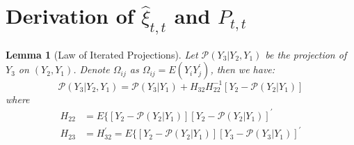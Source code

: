 \documentclass[12pt]{article}
\newtheorem{lemma}{Lemma}
\numberwithin{equation}{section}
\begin{document}

\printbibliography

\pagebreak
\appendix
\section{Derivation of $\hat{\xi}_{t,t}$ and $P_{t,t}$}

\begin{lemma}[Law of Iterated Projections] \label{lem:1}
    Let $\mathcal{P}(Y_3|Y_2,Y_1)$ be the projection of $Y_3$ on $(Y_2, Y_1)$. Denote $\Omega_{ij}$ as $\Omega_{ij} = E(Y_iY_j^{'})$, then we have:
    \[
        \mathcal{P}(Y_3|Y_2,Y_1) = \mathcal{P}(Y_3|Y_1)+H_{32}H_{22}^{-1}[Y_2 - \mathcal{P}(Y_2|Y_1)]
    \]
    where 
    \begin{align*}
        H_{22} &= E\{[Y_2-\mathcal{P}(Y_2|Y_1)][Y_2-\mathcal{P}(Y_2|Y_1)]^{'} \\
        H_{23} &= H_{32}^{'} = E\{[Y_2-\mathcal{P}(Y_2|Y_1)][Y_3-\mathcal{P}(Y_3|Y_1)]^{'} 
    \end{align*}

\end{lemma}
\end{document}
